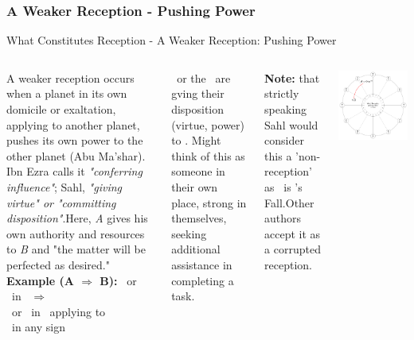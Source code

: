 \subsubsection{A Weaker Reception - Pushing Power}
\begin{frame}[t]{What Constitutes Reception - A Weaker Reception: Pushing Power}
\footnotesize
\begin{columns}[T, onlytextwidth]
A weaker reception occurs when a planet in its own domicile or exaltation, applying to another planet, pushes its own power  to the other planet (Abu Ma'shar). Ibn Ezra calls it \textsl{"conferring influence"}; Sahl, \textsl{"giving virtue" or "committing disposition"}.\footnotemark[1] Here, \textsl{A} gives his own authority and resources to \textsl{B} and "the matter will be perfected as desired." \\
\vspace{0.2cm}
\textbf{Example (A $\Rightarrow$ B):} \Mars\ or \Sun\ in \Aries\ $\Rightarrow$  \Saturn \\
\ul
\vspace{0.2cm}
\Mars\ or \Sun\ in \Aries\ applying to  \\
\Saturn\ in any sign

\vspace{0.25cm}
\Mars\ or the \Sun\ are gving their disposition (virtue, power) to \Saturn. Might think of this as someone in their own place, strong in themselves, seeking additional assistance in completing a task.

\vspace{0.25cm}
\textbf{Note:} that strictly speaking Sahl would consider this a 'non-reception' as \Aries\ is \Saturn's Fall.\footnotemark[2] Other authors accept it as a corrupted reception.

\begin{center}
{\includegraphics[width=\textwidth]{charts/01-weaker-reception}} \\
\end{center}


\end{columns}
\end{frame}
